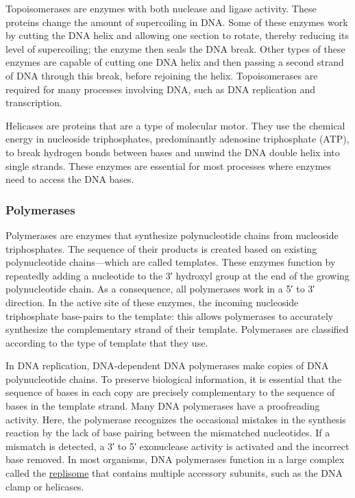 Topoisomerases are enzymes with both nuclease and ligase activity. These proteins change the amount of supercoiling in DNA. Some of these enzymes work by cutting the DNA helix and allowing one section to rotate, thereby reducing its level of supercoiling; the enzyme then seals the DNA break. Other types of these enzymes are capable of cutting one DNA helix and then passing a second strand of DNA through this break, before rejoining the helix. Topoisomerases are required for many processes involving DNA, such as DNA replication and transcription.

Helicases are proteins that are a type of molecular motor. They use the chemical energy in nucleoside triphosphates, predominantly adenosine triphosphate (ATP), to break hydrogen bonds between bases and unwind the DNA double helix into single strands. These enzymes are essential for most processes where enzymes need to access the DNA bases.

\hypertarget{polymerases}{%
\subsubsection{Polymerases}\label{polymerases}}

Polymerases are enzymes that synthesize polynucleotide chains from nucleoside triphosphates. The sequence of their products is created based on existing polynucleotide chains---which are called templates. These enzymes function by repeatedly adding a nucleotide to the 3′ hydroxyl group at the end of the growing polynucleotide chain. As a consequence, all polymerases work in a 5′ to 3′ direction. In the active site of these enzymes, the incoming nucleoside triphosphate base-pairs to the template: this allows polymerases to accurately synthesize the complementary strand of their template. Polymerases are classified according to the type of template that they use.

In DNA replication, DNA-dependent DNA polymerases make copies of DNA polynucleotide chains. To preserve biological information, it is essential that the sequence of bases in each copy are precisely complementary to the sequence of bases in the template strand. Many DNA polymerases have a proofreading activity. Here, the polymerase recognizes the occasional mistakes in the synthesis reaction by the lack of base pairing between the mismatched nucleotides. If a mismatch is detected, a 3′ to 5′ exonuclease activity is activated and the incorrect base removed. In most organisms, DNA polymerases function in a large complex called the \href{https://en.wikipedia.org/wiki/Replisome}{replisome} that contains multiple accessory subunits, such as the DNA clamp or helicases.

